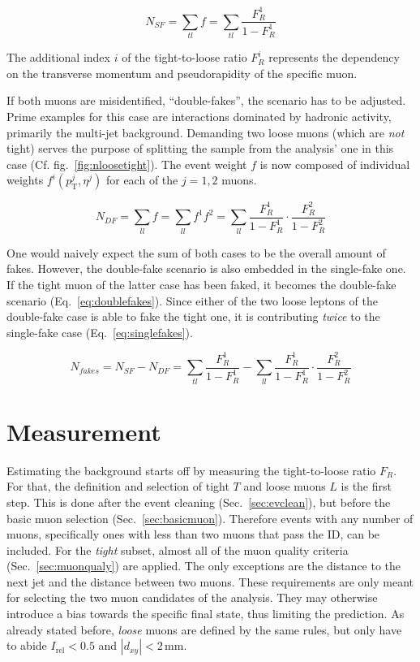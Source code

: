 \begin{equation}
  \label{eq:singlefakes}
  N_{SF} = \sum_{tl} f = \sum_{tl} \frac{F_R^1}{1 - F_R^1}
\end{equation}

\noindent The additional index $i$ of the tight-to-loose ratio $F_R^i$ represents the dependency on the transverse momentum and pseudorapidity of the specific muon. 

If both muons are misidentified, ``double-fakes'', the scenario has to be adjusted. Prime examples for this case are interactions dominated by hadronic activity, primarily the multi-jet background. Demanding two loose muons (which are \textit{not} tight) serves the purpose of splitting the sample from the analysis' one in this case (Cf. fig.~\ref{fig:nloosetight}). The event weight $f$ is now composed of individual weights $f^i (p_{\text{T}}^j, \eta^j)$ for each of the $j = 1, 2$ muons.

\begin{equation}
  \label{eq:doublefakes}
  N_{DF} = \sum_{ll} f = \sum_{ll} f^1 f^2 = \sum_{ll} \frac{F_R^1}{1 - F_R^1} \cdot \frac{F_R^2}{1 - F_R^2}
\end{equation}

One would naively expect the sum of both cases to be the overall amount of fakes. However, the double-fake scenario is also embedded in the single-fake one. If the tight muon of the latter case has been faked, it becomes the double-fake scenario (Eq.~\ref{eq:doublefakes}). Since either of the two loose leptons of the double-fake case is able to fake the tight one, it is contributing \textit{twice} to the single-fake case (Eq.~\ref{eq:singlefakes}).

\begin{equation}
  \label{eq:fakes}
  N_{fakes} = N_{SF} - N_{DF} =  \sum_{tl} \frac{F_R^1}{1 - F_R^1} - \sum_{ll} \frac{F_R^1}{1 - F_R^1} \cdot \frac{F_R^2}{1 - F_R^2}
\end{equation}


\section{Measurement}
\label{sec:tlmeasurement}

Estimating the background starts off by measuring the tight-to-loose ratio $F_R$. For that, the definition and selection of tight $T$ and loose muons $L$ is the first step. This is done after the event cleaning (Sec.~\ref{sec:evclean}), but before the basic muon selection (Sec.~\ref{sec:basicmuon}). Therefore events with any number of muons, specifically ones with less than two muons that pass the ID, can be included. For the \textit{tight} subset, almost all of the muon quality criteria (Sec.~\ref{sec:muonqualy}) are applied. The only exceptions are the distance to the next jet and the distance between two muons. These requirements are only meant for selecting the two muon candidates of the analysis. They may otherwise introduce a bias towards the specific final state, thus limiting the prediction. As already stated before, \textit{loose} muons are defined by the same rules, but only have to abide $I_{\text{rel}} < 0.5$ and $|d_{xy}| < 2\,\text{mm}$.

